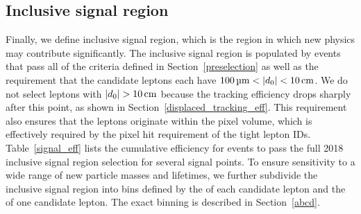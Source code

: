 



\subsection{Inclusive signal region}
Finally, we define inclusive signal region, which is the region in which new physics may contribute significantly. The inclusive signal region is populated by events that pass all of the criteria defined in Section~\ref{preselection} as well as the requirement that the candidate leptons each have $\SI{100}{\um}<\ad<\SI{10}{\cm}$. We do not select leptons with $\ad>\SI{10}{\cm}$ because the tracking efficiency drops sharply after this point, as shown in Section~\ref{displaced_tracking_eff}. This requirement also ensures that the leptons originate within the pixel volume, which is effectively required by the pixel hit requirement of the tight lepton IDs. Table~\ref{signal_eff} lists the cumulative efficiency for \stoptolb events to pass the full 2018 inclusive signal region selection for several signal points. To ensure sensitivity to a wide range of new particle masses and lifetimes, we further subdivide the inclusive signal region into bins defined by the \ad of each candidate lepton and the \pt of one candidate lepton. The exact binning is described in Section~\ref{abcd}.




\pagebreak